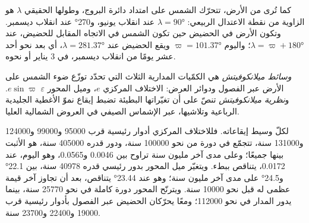 كما تُرى من الأرض، تتحرّك الشمس على امتداد دائرة البروج، وطولها الحقيقي $\lambda$ هو
الزاوية من نقطة الاعتدال الربيعي: $\lambda = \ang{90}$ عند انقلاب يونيو، و\ang{270} عند انقلاب
ديسمبر. وتكون الأرض في الحضيض حين تكون الشمس في الاتجاه المقابل للحضيض،
عند $\lambda = \varpi + \ang{180}$؛ واليوم $\varpi = \ang{101.37}$ ويقع الحضيض عند
$\lambda = \ang{281.37}$، أي بعد نحو أحد عشر يومًا من انقلاب ديسمبر، في 3 يناير أو نحوه.

\begin{definition}\label{def:b2:orbital-forcing:milankovitch}
\emph{وسائط ميلانكوفيتش} هي الكمّيات المدارية الثلاث
التي تحدّد توزّع ضوء الشمس على الأرض عبر الفصول ودوائر
العرض: الاختلاف المركزي $e$، وميل المحور $\varepsilon$ 
$e\sin\varpi$. و\emph{نظرية ميلانكوفيتش} تنصّ على أن تغيّراتها
البطيئة تضبط إيقاع نموّ الأغطية الجليدية الرباعية وتلاشيها، عبر الإشماس الصيفي
في العروض الشمالية العليا.
\end{definition}

لكلّ وسيط إيقاعاته. فللاختلاف المركزي أدوار رئيسية قرب \num{95000}
و\num{99000} و\num{124000} و\num{131000} سنة، تتجمّع في دورة من نحو
\num{100000} سنة، ودور قدره \num{405000} سنة، هو الأثبت بينها جميعًا؛ وعلى مدى آخر
مليون سنة تراوح بين \num{0.0046} و\num{0.0565}، وهو اليوم، عند \num{0.0172}، يتناقص
ببطء. ويتغيّر ميل المحور بدور رئيسي قدره \num{40978} سنة، بين \ang{22.1}
و\ang{24.5} على مدى آخر مليون سنة؛ وهو عند \ang{23.44} يتناقص، بعد أن تجاوز آخر قيمة عظمى له
قبل نحو \num{10000} سنة. ويترنّح المحور دورة كاملة في نحو \num{25770} سنة، بينما
يدور المدار في نحو \num{112000}؛ ومعًا يحرّكان الحضيض عبر الفصول بأدوار
رئيسية قرب \num{19000} و\num{22400} و\num{23700} سنة.

